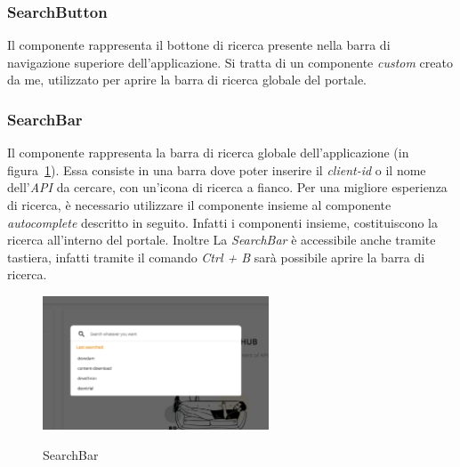 \subsubsection{SearchButton}\label{subsubsec:search-button}
Il componente rappresenta il bottone di ricerca presente nella barra di navigazione superiore dell'applicazione.
Si tratta di un componente \textit{custom} creato da me, utilizzato per aprire la barra di ricerca globale del portale. 

\subsubsection{SearchBar}\label{subsubsec:search-bar}
Il componente rappresenta la barra di ricerca globale dell'applicazione (in figura~\ref{fig:search-bar}). 
Essa consiste in una barra dove poter inserire il \textit{client-id} o il nome dell'\textit{API} da cercare,
con un'icona di ricerca a fianco. Per una migliore esperienza di ricerca, è necessario utilizzare il componente insieme al componente \textit{autocomplete} descritto in seguito.
Infatti i componenti insieme, costituiscono la ricerca all'interno del portale. Inoltre La \textit{SearchBar} è accessibile anche tramite tastiera,
infatti tramite il comando \textit{Ctrl + B} sarà possibile aprire la barra di ricerca.\\

\begin{figure}[ht]
  \centering
  \includegraphics[width=0.6\textwidth, alt={Barra di ricerca globale dell'applicazione}]{images/frontend/SearchBar.jpg}
  \caption{SearchBar}\label{fig:search-bar}
\end{figure}

